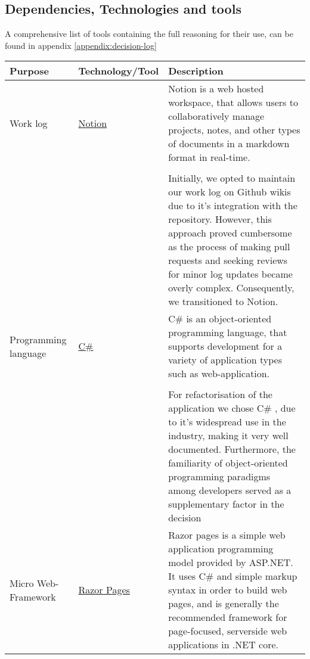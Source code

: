 
\subsection{Dependencies, Technologies and tools}


A comprehensive list of tools containing the full reasoning for their use, can be found in appendix \ref{appendix:decision-log}

\begin{longtable}{|p{}|p{} | p{}|}
    \hline
    \textbf{Purpose} & \textbf{Technology/Tool} & \textbf{Description}\\
    \hline
    Work log & \href{https://www.notion.so/help/guides/category/documentation}{Notion} & Notion is a web hosted workspace, that allows users to collaboratively manage projects, notes, and other types of documents in a markdown format in real-time.\\
    &&\\
    && Initially, we opted to maintain our work log on Github wikis due to it's integration with the repository. However, this approach proved cumbersome as the process of making pull requests and seeking reviews for minor log updates became overly complex. Consequently, we transitioned to Notion.\\ 
    \hline
    Programming language & \href{https://learn.microsoft.com/en-us/dotnet/csharp/}{C\#} &
    C\#  is an object-oriented programming language, that supports development for a variety of application types such as web-application.\\
    && \\
    && For refactorisation of the application we chose C\# , due to it's widespread use in the industry, making it very well documented. Furthermore, the familiarity of object-oriented programming paradigms among developers served as a supplementary factor in the decision\\
    \hline
    Micro Web-Framework & \href{https://learn.microsoft.com/en-us/aspnet/core/razor-pages/?view=aspnetcore-8.0&tabs=visual-studio}{Razor Pages} & Razor pages is a simple web application programming model provided by ASP.NET. It uses C\# and simple markup syntax in order to build web pages, and is generally the recommended framework for page-focused, serverside web applications in .NET core.\\

\end{longtable}
